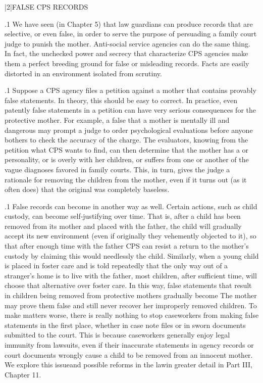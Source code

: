 \documentclass[11pt, twoside]{article}
\begin{document}
{\s|2|{FALSE CPS RECORDS}

\p.1{%
\noindent{}We have seen (in Chapter 5) that law guardians can produce records
that are selective, or even false, in order to serve the  purpose of
persuading a family court judge to punish the mother. Anti-social service agencies can do the same thing. In fact, the unchecked power and
secrecy that characterize CPS agencies make them a perfect breeding
ground for false or misleading records. Facts are easily distorted in an
environment isolated from scrutiny.
}%

\p.1{%
Suppose a CPS agency files a petition against a mother that contains
provably false statements. In theory, this should be easy to correct. In
practice, even patently false statements in a petition can have very serious consequences for the protective mother. For example, a false 
that a mother is mentally ill and dangerous may prompt a judge to order
psychological evaluations before anyone bothers to check the accuracy
of the charge. The evaluators, knowing from the petition what CPS wants
to find, can then determine that the mother has a  or  personality, or is overly  with her children, or suffers
from one or another of the vague diagnoses favored in family courts.
This, in turn, gives the judge a rationale for removing the children from
the mother, even if it turns out (as it often does) that the original 
was completely baseless.
}%

\p.1{%
False records can become  in another way as well. Certain actions, such as child custody, can become self-justifying over time. That
is, after a child has been removed from its mother and placed with
the father, the child will gradually accept its new environment (even
if originally they vehemently objected to it), so that after enough time
with the father CPS can resist a return to the mother's custody by claiming this would needlessly  the child. Similarly, when a young
child is placed in foster care and is told repeatedly that the only way out
of a stranger's home is to live with the father, most children, after sufficient time, will choose that alternative over foster care. In this way, false
statements that result in children being removed from protective mothers gradually become  The mother may prove them false and
still never recover her improperly removed children.
To make matters worse, there is really nothing to stop caseworkers
from making false statements in the first place, whether in case note files
or in sworn documents submitted to the court. This is because caseworkers generally enjoy legal immunity from lawsuits, even if their inaccurate
statements in agency records or court documents wrongly cause a child
to be removed from an innocent mother. We explore this issue\mdash{}and
possible reforms in the law\mdash{}in greater detail in Part III, Chapter 11.
}%


}
\end{document}
